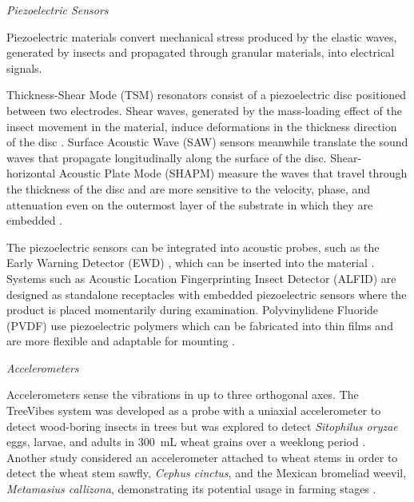 \documentclass[../Vibro-Acoustic Signatures and Detection Algorithms for Stored Product Insects.tex]{subfiles}
\begin{document}
\textit{Piezoelectric Sensors}

Piezoelectric materials convert mechanical stress produced by the elastic waves, generated by insects and propagated through granular materials, into electrical signals.

Thickness-Shear Mode (TSM) resonators consist of a piezoelectric disc positioned between two electrodes. Shear waves, generated by the mass-loading effect of the insect movement in the material, induce deformations in the thickness direction of the disc \cite{frenchLateralFieldExcited2007}. Surface Acoustic Wave (SAW) sensors meanwhile translate the sound waves that propagate longitudinally along the surface of the disc. Shear-horizontal Acoustic Plate Mode (SHAPM) measure the waves that travel through the thickness of the disc and are more sensitive to the velocity, phase, and attenuation even on the outermost layer of the substrate in which they are embedded \cite{loganathanNonchemicalMethodsDisinfestation2025}.

The piezoelectric sensors can be integrated into acoustic probes, such as the Early Warning Detector (EWD) \cite{fleurat-lessardAcousticDetectionAutomatic2006}, which can be inserted into the material \cite{eliopoulosDetectionAdultBeetles2015,changBioacousticDetectionFour2025}. Systems such as Acoustic Location Fingerprinting Insect Detector (ALFID) \cite{shumanQuantitativeAcousticalDetection1993} are designed as standalone receptacles with embedded piezoelectric sensors where the product is placed momentarily during examination. Polyvinylidene Fluoride (PVDF) use piezoelectric polymers which can be fabricated into thin films and are more flexible and adaptable for mounting \cite{mankinBugBytesSound2019}.

\newpage
\textit{Accelerometers}

Accelerometers sense the vibrations in up to three orthogonal axes. The TreeVibes system was developed as a probe with a uniaxial accelerometer to detect wood-boring insects in trees but was explored to detect \textit{Sitophilus oryzae} eggs, larvae, and adults in \SI{300}{\milli\liter} wheat grains over a weeklong period \cite{potamitisInVivoVibroacousticSurveillance2019, rigakisTreeVibesModernTools2021}. Another study considered an accelerometer attached to wheat stems in order to detect the wheat stem sawfly, \textit{Cephus cinctus}, and the Mexican bromeliad weevil, \textit{Metamasius callizona}, demonstrating its potential usage in farming stages \cite{mankinAcousticSystemInsect2004, mankinAutomatedApplicationsAcoustics2021}.
\end{document}
